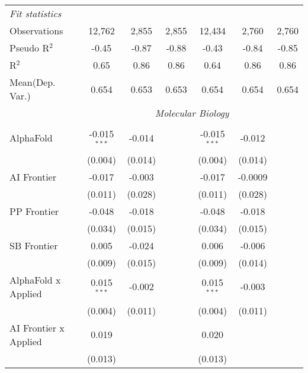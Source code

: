 \begin{tabular}{lcccccc}
   \midrule
   \emph{Fit statistics}\\
   Observations                   & 12,762         & 2,855   & 2,855          & 12,434         & 2,760   & 2,760\\  
   Pseudo R$^2$                   & -0.45          & -0.87   & -0.88          & -0.43          & -0.84   & -0.85\\  
   R$^2$                          & 0.65           & 0.86    & 0.86           & 0.64           & 0.86    & 0.86\\  
Mean(Dep. Var.) & 0.654 & 0.653 & 0.653 & 0.654 & 0.654 & 0.654 \\
   
 & \multicolumn{6}{c}{\textit{Molecular Biology}} \\ \\
   AlphaFold                    & -0.015$^{***}$ & -0.014  &               & -0.015$^{***}$ & -0.012  &   \\   
                                & (0.004)        & (0.014) &               & (0.004)        & (0.014) &   \\   
   AI Frontier                  & -0.017         & -0.003  &               & -0.017         & -0.0009 &   \\   
                                & (0.011)        & (0.028) &               & (0.011)        & (0.028) &   \\   
   PP Frontier                  & -0.048         & -0.018  &               & -0.048         & -0.018  &   \\   
                                & (0.034)        & (0.015) &               & (0.034)        & (0.015) &   \\   
   SB Frontier                  & 0.005          & -0.024  &               & 0.006          & -0.006  &   \\   
                                & (0.009)        & (0.015) &               & (0.009)        & (0.014) &   \\   
   AlphaFold x Applied          & 0.015$^{***}$  & -0.002  &               & 0.015$^{***}$  & -0.003  &   \\   
                                & (0.004)        & (0.011) &               & (0.004)        & (0.011) &   \\   
   AI Frontier x Applied        & 0.019          &         &               & 0.020          &         &   \\   
                                & (0.013)        &         &               & (0.013)        &         &   \\   

\end{tabular}
